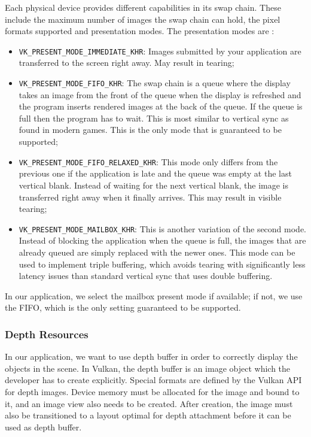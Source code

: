 Each physical device provides different capabilities in its swap chain. These include the maximum number of images the swap chain can hold, the pixel formats supported and presentation modes. The presentation modes are \cite{vulkan_tutorial}:
\begin{itemize}
    \item \texttt{VK\_PRESENT\_MODE\_IMMEDIATE\_KHR}: Images submitted by your application are transferred to the screen right away. May result in tearing;
    \item \texttt{VK\_PRESENT\_MODE\_FIFO\_KHR}: The swap chain is a queue where the display takes an image from the front of the queue when the display is refreshed and the program inserts rendered images at the back of the queue. If the queue is full then the program has to wait. This is most similar to vertical sync as found in modern games. This is the only mode that is guaranteed to be supported;
    \item \texttt{VK\_PRESENT\_MODE\_FIFO\_RELAXED\_KHR}: This mode only differs from the previous one if the application is late and the queue was empty at the last vertical blank. Instead of waiting for the next vertical blank, the image is transferred right away when it finally arrives. This may result in visible tearing;
    \item \texttt{VK\_PRESENT\_MODE\_MAILBOX\_KHR}: This is another variation of the second mode. Instead of blocking the application when the queue is full, the images that are already queued are simply replaced with the newer ones. This mode can be used to implement triple buffering, which avoids tearing with significantly less latency issues than standard vertical sync that uses double buffering.
\end{itemize}

In our application, we select the mailbox present mode if available; if not, we use the FIFO, which is the only setting guaranteed to be supported.

\subsubsection{Depth Resources}
In our application, we want to use depth buffer in order to correctly display the objects in the scene. In Vulkan, the depth buffer is an image object which the developer has to create explicitly. Special formats are defined by the Vulkan API for depth images. Device memory must be allocated for the image and bound to it, and an image view also needs to be created. After creation, the image must also be transitioned to a layout optimal for depth attachment before it can be used as depth buffer.

